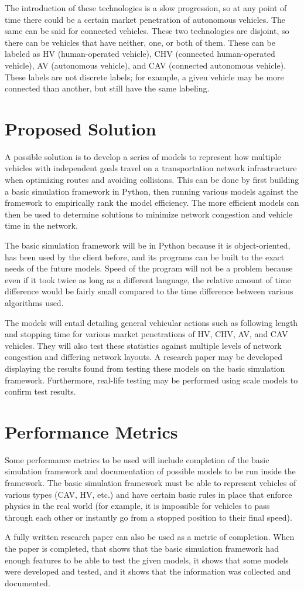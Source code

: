 \documentclass[10pt,letterpaper,draftclsnofoot,onecolumn]{IEEEtran}
\begin{document}
	The introduction of these technologies is a slow progression, so at any point of time there could be a certain market penetration of autonomous vehicles. The same can be said for connected vehicles. These two technologies are disjoint, so there can be vehicles that have neither, one, or both of them. These can be labeled as HV (human-operated vehicle), CHV (connected human-operated vehicle), AV (autonomous vehicle), and CAV (connected autonomous vehicle). These labels are not discrete labels; for example, a given vehicle may be more connected than another, but still have the same labeling.
\section{Proposed Solution}
	A possible solution is to develop a series of models to represent how multiple vehicles with independent goals travel on a transportation network infrastructure when optimizing routes and avoiding collisions. This can be done by first building a basic simulation framework in Python, then running various models against the framework to empirically rank the model efficiency. The more efficient models can then be used to determine solutions to minimize network congestion and vehicle time in the network.

	The basic simulation framework will be in Python because it is object-oriented, has been used by the client before, and its programs can be built to the exact needs of the future models. Speed of the program will not be a problem because even if it took twice as long as a different language, the relative amount of time difference would be fairly small compared to the time difference between various algorithms used.

	The models will entail detailing general vehicular actions such as following length and stopping time for various market penetrations of HV, CHV, AV, and CAV vehicles. They will also test these statistics against multiple levels of network congestion and differing network layouts. A research paper may be developed displaying the results found from testing these models on the basic simulation framework. Furthermore, real-life testing may be performed using scale models to confirm test results.
\section{Performance Metrics}
	Some performance metrics to be used will include completion of the basic simulation framework and documentation of possible models to be run inside the framework. The basic simulation framework must be able to represent vehicles of various types (CAV, HV, etc.) and have certain basic rules in place that enforce physics in the real world (for example, it is impossible for vehicles to pass through each other or instantly go from a stopped position to their final speed).

	A fully written research paper can also be used as a metric of completion. When the paper is completed, that shows that the basic simulation framework had enough features to be able to test the given models, it shows that some models were developed and tested, and it shows that the information was collected and documented.
\end{document}
